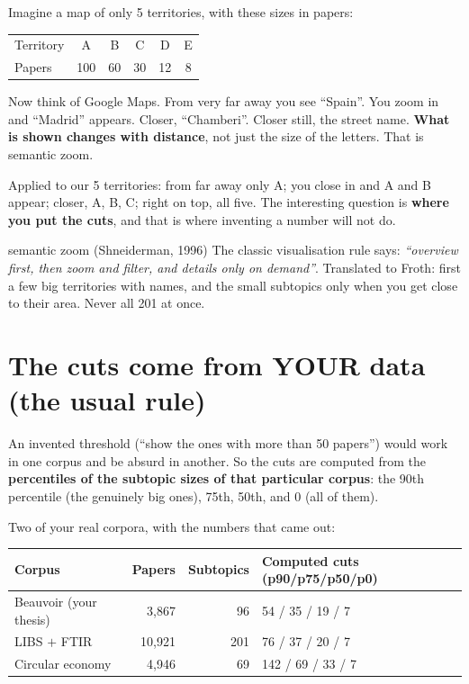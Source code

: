 \documentclass[11pt,a4paper]{article}
\begin{document}
Imagine a map of only 5 territories, with these sizes in papers:

\begin{center}
\begin{tabular}{lccccc}
\hline
Territory & A & B & C & D & E \\
Papers    & 100 & 60 & 30 & 12 & 8 \\
\hline
\end{tabular}
\end{center}

Now think of Google Maps. From very far away you see ``Spain''. You zoom in and ``Madrid''
appears. Closer, ``Chamberi''. Closer still, the street name. \textbf{What is shown changes with
distance}, not just the size of the letters. That is semantic zoom.

Applied to our 5 territories: from far away only A; you close in and A and B appear; closer, A,
B, C; right on top, all five. The interesting question is \textbf{where you put the cuts}, and
that is where inventing a number will not do.

\begin{concepto}{semantic zoom (Shneiderman, 1996)}
The classic visualisation rule says: \emph{``overview first, then zoom and filter, and details
only on demand''}. Translated to Froth: first a few big territories with names, and the small
subtopics only when you get close to their area. Never all 201 at once.
\end{concepto}

\section{The cuts come from YOUR data (the usual rule)}

An invented threshold (``show the ones with more than 50 papers'') would work in one corpus and
be absurd in another. So the cuts are computed from the \textbf{percentiles of the subtopic
sizes of that particular corpus}: the 90th percentile (the genuinely big ones), 75th, 50th, and
0 (all of them).

Two of your real corpora, with the numbers that came out:

\begin{center}
\begin{tabular}{lrrl}
\hline
Corpus & Papers & Subtopics & Computed cuts (p90/p75/p50/p0) \\
\hline
Beauvoir (your thesis) & 3,867  & 96  & 54 / 35 / 19 / 7 \\
LIBS $+$ FTIR          & 10,921 & 201 & 76 / 37 / 20 / 7 \\
Circular economy       & 4,946  & 69  & 142 / 69 / 33 / 7 \\
\hline
\end{tabular}
\end{center}
\end{document}
